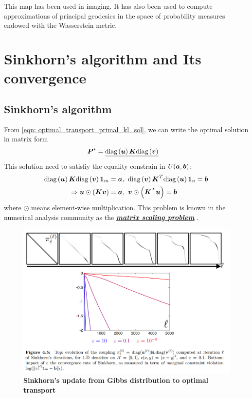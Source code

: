 \documentclass[11pt]{article}
\begin{document}
This map has been used in imaging. It has also been used to compute approximations of principal geodesics in the space of probability measures endowed with the Wasserstein metric.


\newpage
\section{Sinkhorn's algorithm and Its convergence}
\subsection{Sinkhorn's algorithm}
From \eqref{eqn: optimal_transport_primal_kl_sol}, we can write the optimal solution in matrix form
\begin{align}
\boldsymbol{P}^{*} &=\underline{\text{diag}\left(\boldsymbol{u}\right)\boldsymbol{K}\text{diag}\left(\boldsymbol{v}\right)} \nonumber
\end{align} This solution need to satisfiy the equality constrain in $U(\boldsymbol{a}, \boldsymbol{b})$: 
\begin{align}
\text{diag}\left(\boldsymbol{u}\right)\boldsymbol{K}\text{diag}\left(\boldsymbol{v}\right)\boldsymbol{1}_{m} = \boldsymbol{a}, \;&\; \text{diag}\left(\boldsymbol{v}\right)\boldsymbol{K}^{T}\text{diag}\left(\boldsymbol{u}\right)\boldsymbol{1}_{n} = \boldsymbol{b} \nonumber\\
\Rightarrow \boldsymbol{u} \odot\left(\boldsymbol{K}\boldsymbol{v}\right)  = \boldsymbol{a}, \;&\; \boldsymbol{v} \odot\left(\boldsymbol{K}^{T}\boldsymbol{u}\right)  = \boldsymbol{b} \label{eqn: optimal_transport_sol_condition}
\end{align} where $\odot$ means element-wise multiplication. This problem is known in the numerical analysis community as the \underline{\textbf{\emph{matrix scaling problem}}} \citep{franklin1989scaling, nemirovski1999complexity}.


\begin{figure}
\begin{minipage}[t]{1\linewidth}
  \centering
  \centerline{\includegraphics[scale = 0.4]{sinkhorn_update.png}}
\end{minipage}
\caption{\footnotesize{\textbf{Sinkhorn's update from Gibbs distribution to optimal transport}}}
\label{fig: sinkhorn_update}
\end{figure}
\end{document}
